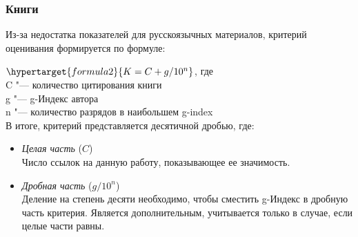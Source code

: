 \documentclass{article}
\begin{document}
		\subsubsection{Книги}
		Из-за недостатка показателей для русскоязычных материалов, критерий оценивания формируется по формуле:
			
			$ \hypertarget{formula2}{K = C + g / 10^n} $, где \\
			C  "---  количество цитирования книги \\
			g "--- g-Индекс автора\\
			n "--- количество разрядов в наибольшем g-index \\			
			В итоге, критерий представляется десятичной дробью, где: 
				\begin{itemize}
					\item \textit{Целая часть} ($C$)\\
						Число ссылок на данную работу, показывающее ее значимость.
					\item \textit{Дробная часть} ($g / 10^n$)\\
						Деление на степень десяти необходимо, чтобы сместить g-Индекс в дробную часть критерия. Является дополнительным, учитывается только в случае, если целые части равны.
				\end{itemize}
\end{document}
